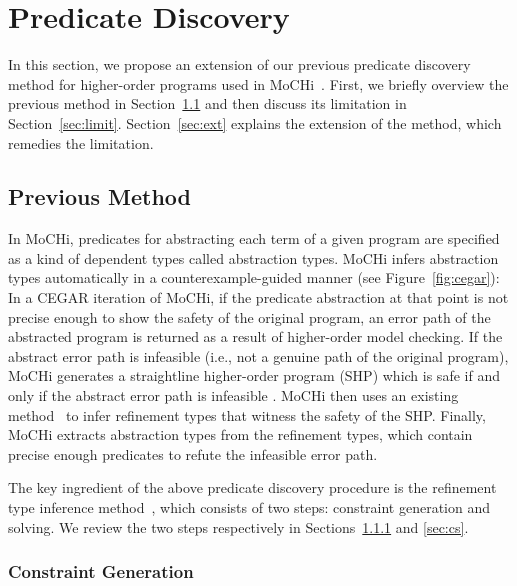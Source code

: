 

\vspace{-5pt}
\section{Predicate Discovery}
\label{sec:refine}

In this section, we propose an extension of our previous predicate
discovery method for higher-order programs used in
MoCHi~\cite{KobayashiPLDI2011}.  First, we briefly overview the previous
method in Section~\ref{sec:prev} and then discuss its limitation in
Section~\ref{sec:limit}. Section~\ref{sec:ext} explains the extension of
the method, which remedies the limitation.

\vspace{-2pt}
\subsection{Previous Method}
\label{sec:prev}

In MoCHi, predicates for abstracting each term of a given program are
specified as a kind of dependent types called abstraction types.  MoCHi
infers abstraction types automatically in a counterexample-guided manner
(see Figure~\ref{fig:cegar}): In a CEGAR iteration of MoCHi, if the
predicate abstraction at that point is not precise enough to show the
safety of the original program, an error path of the abstracted program
is returned as a result of higher-order model checking.  If the abstract
error path is infeasible (i.e., not a genuine path of the original
program), MoCHi generates a straightline higher-order program (SHP)
which is safe if and only if the abstract error path is infeasible .
MoCHi then uses an existing method~\cite{Unno2009} to infer refinement
types that witness the safety of the SHP.  Finally, MoCHi extracts
abstraction types from the refinement types, which contain precise
enough predicates to refute the infeasible error path.

The key ingredient of the above predicate discovery procedure is the
refinement type inference
method~\cite{Unno2009,Terauchi2010,KobayashiPLDI2011}, which consists of
two steps: constraint generation and solving.  We review the two steps
respectively in Sections~\ref{sec:cg} and \ref{sec:cs}.

\vspace{-2pt}
\subsubsection{Constraint Generation}
\label{sec:cg}

